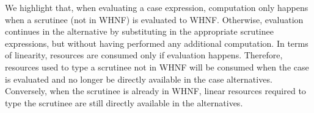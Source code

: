 \documentclass[acmsmall,review,anonymous,screen]{acmart}
\begin{document}
We highlight that, when evaluating a case expression, computation only
happens when a scrutinee (not in WHNF) is evaluated to
WHNF. Otherwise, evaluation continues in the alternative by
substituting in the appropriate scrutinee expressions, but without
having performed any additional computation.
%
In terms of linearity, resources are consumed only if evaluation happens.
Therefore, resources used to type a scrutinee not in
WHNF will be consumed when the case is evaluated and no longer be directly available in the case
alternatives. Conversely, when the scrutinee is already in WHNF, linear
resources required to type the scrutinee are still directly available in the
alternatives.
%

%
%
%
%
%


\end{document}
